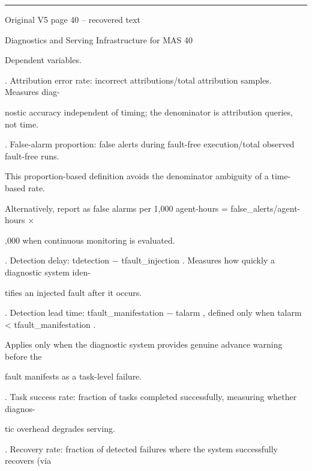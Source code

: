 \par\smallskip\noindent\rule{\textwidth}{0.4pt}\par{\sffamily\footnotesize Original V5 page 40 -- recovered text}\par\begin{flushleft}\footnotesize\ttfamily
\par\smallskip
\par\smallskip
\noindent Diagnostics and Serving Infrastructure for MAS 40\par
\par\smallskip
\par\smallskip
\par\smallskip
\noindent Dependent variables.\par
{}. Attribution error rate: incorrect attributions/total attribution samples. Measures diag-\par
\noindent  nostic accuracy independent of timing; the denominator is attribution queries, not time.\par
{}. False-alarm proportion: false alerts during fault-free execution/total observed fault-free runs.\par
\noindent  This proportion-based definition avoids the denominator ambiguity of a time-based rate.\par
\noindent  Alternatively, report as false alarms per 1,000 agent-hours = false\_alerts/agent-hours ×\par
{},000 when continuous monitoring is evaluated.\par
{}. Detection delay: tdetection − tfault\_injection . Measures how quickly a diagnostic system iden-\par
\noindent  tifies an injected fault after it occurs.\par
{}. Detection lead time: tfault\_manifestation − talarm , defined only when talarm < tfault\_manifestation .\par
\noindent  Applies only when the diagnostic system provides genuine advance warning before the\par
\noindent  fault manifests as a task-level failure.\par
{}. Task success rate: fraction of tasks completed successfully, measuring whether diagnos-\par
\noindent  tic overhead degrades serving.\par
{}. Recovery rate: fraction of detected failures where the system successfully recovers (via\par

\end{flushleft}
